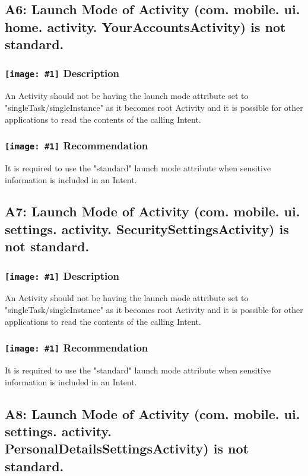 \documentclass[12p]{article}
\newcommand{\icon}[1]{\texttt{[image: \#1]}}
\begin{document}
\subsection{A6: Launch Mode of Activity (com. mobile. ui. home. activity. YourAccountsActivity) is not standard.}
\subsubsection*{\protect\icon{/home/miki/Documents/GITHUB/AndroidPermissions/python/vulns/report_icons/basic_sheet.png} Description}
An Activity should not be having the launch mode attribute set to "singleTask/singleInstance" as it becomes root Activity and it is possible for other applications to read the contents of the calling Intent.
\subsubsection*{\protect\icon{/home/miki/Documents/GITHUB/AndroidPermissions/python/vulns/report_icons/basic_todo.png} Recommendation}
It is required to use the "standard" launch mode attribute when sensitive information is included in an Intent.
\subsection{A7: Launch Mode of Activity (com. mobile. ui. settings. activity. SecuritySettingsActivity) is not standard.}
\subsubsection*{\protect\icon{/home/miki/Documents/GITHUB/AndroidPermissions/python/vulns/report_icons/basic_sheet.png} Description}
An Activity should not be having the launch mode attribute set to "singleTask/singleInstance" as it becomes root Activity and it is possible for other applications to read the contents of the calling Intent.
\subsubsection*{\protect\icon{/home/miki/Documents/GITHUB/AndroidPermissions/python/vulns/report_icons/basic_todo.png} Recommendation}
It is required to use the "standard" launch mode attribute when sensitive information is included in an Intent.
\subsection{A8: Launch Mode of Activity (com. mobile. ui. settings. activity. PersonalDetailsSettingsActivity) is not standard.}
\end{document}
